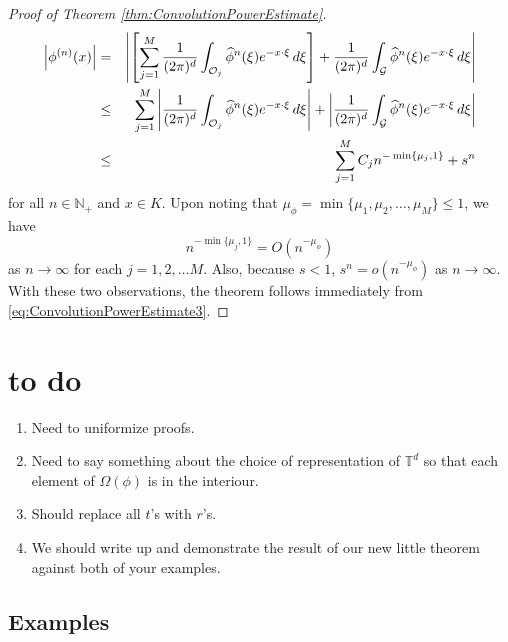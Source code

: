 \documentclass[11pt]{article}
\newcommand{\lb}{\left[}
\newcommand{\rb}{\right]}
\begin{document}
\begin{proof}[Proof of Theorem \ref{thm:ConvolutionPowerEstimate}]
\begin{eqnarray}\label{eq:ConvolutionPowerEstimate3}\nonumber
    \abs{\phi^{(n)}(x)}
    &=&\abs{\lb \sum_{j=1}^M\frac{1}{(2\pi)^d}\int_{\mathcal{O}_j}\widehat{\phi}^n(\xi)e^{-x\cdot\xi}\,d\xi \rb
    +\frac{1}{(2\pi)^d}\int_{\mathcal{G}}\widehat{\phi}^n(\xi)e^{-x\cdot\xi}\,d\xi}\\\nonumber
    &\leq&\sum_{j=1}^M\abs{\frac{1}{(2\pi)^d}\int_{\mathcal{O}_j}\widehat{\phi}^n(\xi)e^{-x\cdot\xi}\,d\xi}+\abs{\frac{1}{(2\pi)^d}\int_{\mathcal{G}}\widehat{\phi}^n(\xi)e^{-x\cdot\xi}\,d\xi}\\
    &\leq&\sum_{j=1}^M C_jn^{-\min\{\mu_j,1\}}+s^n
\end{eqnarray}
for all $n\in\mathbb{N}_+$ and $x\in K$. Upon noting that $\mu_\phi=\min\{\mu_1,\mu_2,\dots,\mu_M\}\leq 1$, we have
\begin{equation*}
    n^{-\min\{\mu_j,1\}}=O(n^{-\mu_\phi})
\end{equation*}
as $n\to\infty$ for each $j=1,2,\dots M$. Also, because $s<1$, $s^n=o(n^{-\mu_\phi})$ as $n\to \infty$. With these two observations, the theorem follows immediately from \eqref{eq:ConvolutionPowerEstimate3}.
\end{proof}

\section{to do}
\begin{enumerate}
\item Need to uniformize proofs.
\item Need to say something about the choice of representation of $\mathbb{T}^d$ so that each element of $\Omega(\phi)$ is in the interiour. 
    \item Should replace all $t$'s with $r$'s.
    \item We should write up and demonstrate the result of our new little theorem against both of your examples. 
\end{enumerate}



\subsection{Examples}







\appendix

\end{document}
